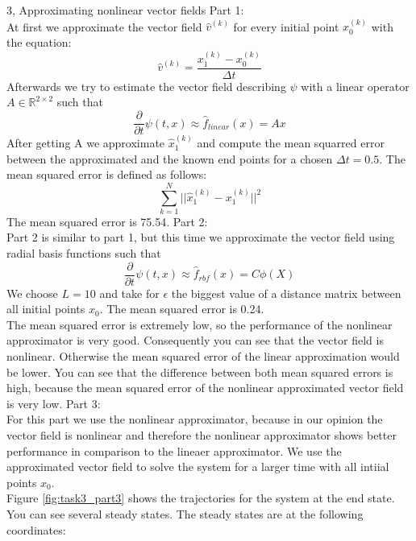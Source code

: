 \documentclass[10pt,a4paper]{article}
\begin{document}
\begin{task}{3, Approximating nonlinear vector fields}
Part 1: \\
At first we approximate the vector field $\hat{v}^{(k)}$ for every initial point $x_0^{(k)}$ with the equation:
\begin{equation*}
\hat{v}^{(k)} = \frac{x_1^{(k)} -x_0^{(k)}}{\Delta t}
\end{equation*}
Afterwards we try to estimate the vector field describing $\psi$ with a linear operator $A \in \mathbb{R}^{2\times2}$ such that
\begin{equation*}
\frac{\partial}{\partial t} \psi(t,x) \approx \hat{f}_{linear}(x) = Ax
\end{equation*}
After getting A we approximate $\hat{x}_1^{(k)}$ and compute the mean squarred error between the approximated and the known end points for a chosen $\Delta t = 0.5$.
The mean squared  error is defined as follows:
\begin{equation*}
\sum_{k=1}^N ||\hat{x}_1^{(k)} - x_{1}^{(k)}||^2
\end{equation*}
The mean squared error is 75.54.\bigbreak
Part 2: \\
Part 2 is similar to part 1, but this time we approximate the vector field using radial basis functions such that
\begin{equation*}
\frac{\partial}{\partial t}\psi(t,x) \approx \hat{f}_{rbf}(x) = C \phi(X)
\end{equation*}
 We choose $L=10$ and take  for $\epsilon$ the biggest value of a distance matrix between all initial points $x_0$.
The mean squared error is 0.24. \\
The mean squared error is extremely low, so the performance of the nonlinear approximator is very good. Consequently you can see that the vector field is nonlinear. Otherwise the mean squared error of the linear approximation would be lower.
You can see that the difference between both mean squared errors is high, because the mean squared error of the nonlinear approximated vector field is very low. \bigbreak
Part 3: \\
For this part we use the nonlinear approximator, because in our opinion the vector field is nonlinear and therefore the nonlinear approximator shows better performance in comparison to the lineaer approximator. We use the approximated vector field to solve  the system for a larger time with all intiial points $x_0$.\\
Figure \ref{fig:task3_part3} shows the trajectories for the system at the end state. You can see several steady states. The steady states are at the following coordinates: \bigbreak

\end{task}
\end{document}
